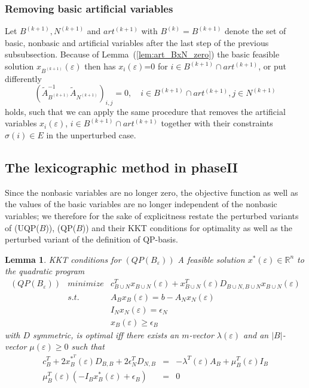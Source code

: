 \documentclass[a4paper]{article}
\newcommand{\xe}[1]{\ensuremath{x_{#1}(\varepsilon)}}
\newtheorem{lemma}{Lemma}
\begin{document}
\subsubsection{Removing basic artificial variables}
Let $B^{(k+1)}, N^{(k+1)}$ and $art^{(k+1)}$ with $B^{(k)}=B^{(k+1)}$
denote the set of basic, nonbasic and artificial variables after the last step
of the previous subsubsection.
Because of Lemma~(\ref{lem:art_BxN_zero})
the basic feasible solution \xe{B^{(k+1)}} then
has \xe{i}=0 for $i \in B^{(k+1)} \cap art^{(k+1)}$, or put differently
\begin{equation}
\left(\tilde{A}_{B^{(k+1)}}^{-1}\tilde{A}_{N^{(k+1)}}\right)_{i,j}=0,
\quad i \in B^{(k+1)} \cap art^{(k+1)}, j \in N^{(k+1)}
\end{equation}
holds, such that we can apply the same procedure that removes
the artificial variables \xe{i}, $i \in B^{(k+1)} \cap art^{(k+1)}$ together
with their constraints $\sigma(i) \in E$ in the unperturbed case. 
\subsection{The lexicographic method in phaseII}
Since the nonbasic variables are no longer zero, the objective function as well as
the values of the basic variables are no longer independent of the nonbasic
variables; we therefore for the sake of explicitness restate the perturbed
variants of (UQP($B$)), (QP($B$)) and their KKT conditions for optimality
as well as the perturbed variant of the definition of QP-basis.

\begin{lemma}{KKT conditions for $(QP(B_{\varepsilon}))$}
\label{lemma:KKT_QP(B)_epsilon}
A feasible solution $x^{*}(\varepsilon) \in \mathbb{R}^{n}$ to the quadratic
program
\begin{eqnarray*}
  \mbox{$(QP(B_{\varepsilon}))$} & minimize & c_{B \cup N}^{T}
    x_{B \cup N}(\varepsilon)
    + x_{B \cup N}^{T}(\varepsilon) 
    D_{B \cup N, B \cup N} x_{B \cup N}(\varepsilon) \\
    & s.t. & A_{B}x_{B}(\varepsilon) = b - A_{N}x_{N}(\varepsilon)  \\
    & & I_{N}x_{N}(\varepsilon) = \epsilon_{N}  \\
    & & x_{B}(\varepsilon) \geq \epsilon_{B}
\end{eqnarray*}
with $D$ symmetric, is optimal iff there exists an $m$-vector
$\lambda(\varepsilon)$ and an $\left|B\right|$-vector $\mu(\varepsilon) \geq 0$
such that
\begin{eqnarray}
  c_{B}^{T} + 2x_{B}^{*^{\scriptstyle{T}}}(\varepsilon)D_{B,B} +
  2\epsilon_{N}^{T}D_{N,B} & = &
  -\lambda^{T}(\varepsilon)A_{B} + \mu_{B}^{T}(\varepsilon)I_{B} \\
  \mu_{B}^{T}(\varepsilon) \left( -I_{B}x_{B}^{*}(\varepsilon) +
    \epsilon_{B} \right) & = & 0
\end{eqnarray}
\end{lemma}
\end{document}
